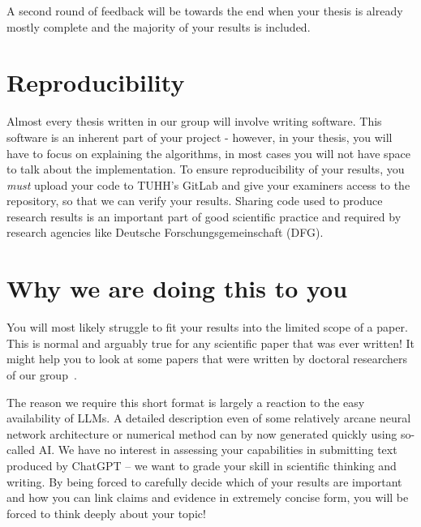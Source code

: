 \documentclass[conference]{IEEEtran}
\begin{document}
A second round of feedback will be towards the end when your thesis is already mostly complete and the majority of your results is included.
\section{Reproducibility}
Almost every thesis written in our group will involve writing software.
This software is an inherent part of your project - however, in your thesis, you will have to focus on explaining the algorithms, in most cases you will not have space to talk about the implementation.
To ensure reproducibility of your results, you \emph{must} upload your code to TUHH's GitLab and give your examiners access to the repository, so that we can verify your results.
Sharing code used to produce research results is an important part of good scientific practice and required by research agencies like Deutsche Forschungsgemeinschaft (DFG).

\section{Why we are doing this to you}
You will most likely struggle to fit your results into the limited scope of a paper.
This is normal and arguably true for any scientific paper that was ever written!
It might help you to look at some papers that were written by doctoral researchers of our group~\cite{IbrahimEtAl2023,IbrahimEtAl2025,JohnEtAl2026}.

The reason we require this short format is largely a reaction to the easy availability of LLMs.
A detailed description even of some relatively arcane neural network architecture or numerical method can by now generated quickly using so-called AI.
We have no interest in assessing your capabilities in submitting text produced by ChatGPT -- we want to grade your skill in scientific thinking and writing.
By being forced to carefully decide which of your results are important and how you can link claims and evidence in extremely concise form, you will  be forced to think deeply about your topic!



\end{document}
